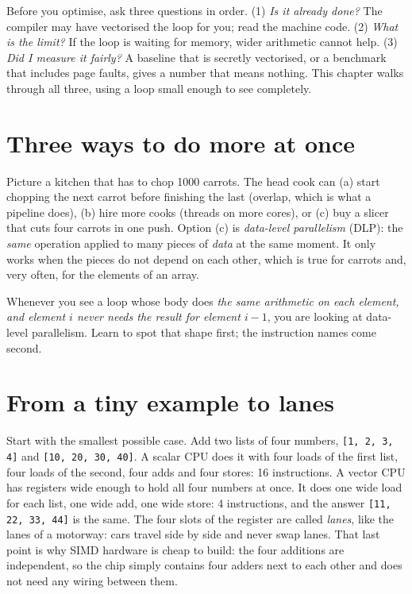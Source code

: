 \begin{principle}
Before you optimise, ask three questions in order. (1) \emph{Is it
already done?} The compiler may have vectorised the loop for you;
read the machine code. (2) \emph{What is the limit?} If the loop is
waiting for memory, wider arithmetic cannot help. (3) \emph{Did I
measure it fairly?} A baseline that is secretly vectorised, or a
benchmark that includes page faults, gives a number that means
nothing. This chapter walks through all three, using a loop small
enough to see completely.
\end{principle}

\section{Three ways to do more at once}

Picture a kitchen that has to chop 1000 carrots. The head cook can
(a) start chopping the next carrot before finishing the last (overlap,
which is what a pipeline does), (b) hire more cooks (threads on more
cores), or (c) buy a slicer that cuts four carrots in one push. Option
(c) is \emph{data-level parallelism} (DLP): the \emph{same} operation
applied to many pieces of \emph{data} at the same moment. It only works
when the pieces do not depend on each other, which is true for carrots
and, very often, for the elements of an array.


\begin{principle}
Whenever you see a loop whose body does \emph{the same arithmetic on
each element, and element $i$ never needs the result for element
$i-1$}, you are looking at data-level parallelism. Learn to spot that
shape first; the instruction names come second.
\end{principle}

\section{From a tiny example to lanes}

Start with the smallest possible case. Add two lists of four numbers,
\texttt{[1, 2, 3, 4]} and \texttt{[10, 20, 30, 40]}. A scalar CPU does
it with four loads of the first list, four loads of the second, four
adds and four stores: 16 instructions. A vector CPU has registers wide
enough to hold all four numbers at once. It does one wide load for
each list, one wide add, one wide store: 4 instructions, and the
answer \texttt{[11, 22, 33, 44]} is the same. The four slots of the
register are called \emph{lanes}, like the lanes of a motorway: cars
travel side by side and never swap lanes. That last point is why SIMD
hardware is cheap to build: the four additions are independent, so
the chip simply contains four adders next to each other and does not
need any wiring between them.


